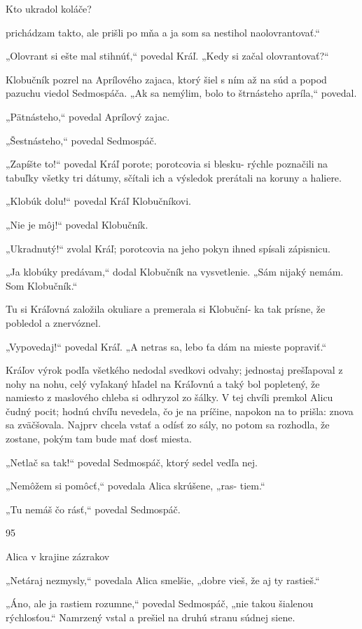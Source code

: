 \documentclass[12pt]{book}
\begin{document}
\begin{Parallel}[p]{}{}
{Kto ukradol koláče?

prichádzam takto, ale prišli po mňa a ja som sa nestihol
naolovrantovať.“

„Olovrant si ešte mal stihnúť,“ povedal Kráľ. „Kedy si
začal olovrantovať?“

Klobučník pozrel na Aprílového zajaca, ktorý šiel s ním až
na súd a popod pazuchu viedol Sedmospáča. „Ak sa
nemýlim, bolo to štrnásteho apríla,“ povedal.

„Pätnásteho,“ povedal Aprílový zajac.

„Šestnásteho,“ povedal Sedmospáč.

„Zapíšte to!“ povedal Kráľ porote; porotcovia si blesku-
rýchle poznačili na tabuľky všetky tri dátumy, sčítali ich
a výsledok prerátali na koruny a haliere.

„Klobúk dolu!“ povedal Kráľ Klobučníkovi.

„Nie je môj!“ povedal Klobučník.

„Ukradnutý!“ zvolal Kráľ; porotcovia na jeho pokyn
ihned spísali zápisnicu.

„Ja klobúky predávam,“ dodal Klobučník na vysvetlenie.
„Sám nijaký nemám. Som Klobučník.“

Tu si Kráľovná založila okuliare a premerala si Klobuční-
ka tak prísne, že pobledol a znervóznel.

„Vypovedaj!“ povedal Kráľ. „A netras sa, lebo ťa dám
na mieste popraviť.“

Kráľov výrok podľa všetkého nedodal svedkovi odvahy;
jednostaj prešľapoval z nohy na nohu, celý vyľakaný hľadel
na Kráľovnú a taký bol popletený, že namiesto z maslového
chleba si odhryzol zo šálky. V tej chvíli premkol Alicu čudný
pocit; hodnú chvíľu nevedela, čo je na príčine, napokon na
to prišla: znova sa zväčšovala. Najprv chcela vstať a odísť zo
sály, no potom sa rozhodla, že zostane, pokým tam bude mať
dosť miesta.

„Netlač sa tak!“ povedal Sedmospáč, ktorý sedel vedľa
nej.

„Nemôžem si pomôcť,“ povedala Alica skrúšene, „ras-
tiem.“

„Tu nemáš čo rásť,“ povedal Sedmospáč.

95

Alica v krajine zázrakov

„Netáraj nezmysly,“ povedala Alica smelšie, „dobre vieš,
že aj ty rastieš.“

„Áno, ale ja rastiem rozumne,“ povedal Sedmospáč, „nie
takou šialenou rýchlosťou.“ Namrzený vstal a prešiel na
druhú stranu súdnej siene.

}
\end{Parallel}
\end{document}
